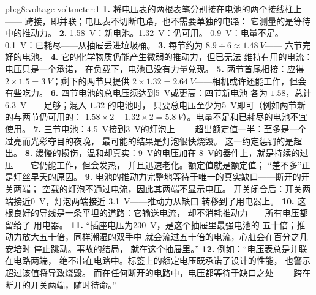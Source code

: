 \begin{solution}{pb:g8:voltage-voltmeter:1}
\textbf{1.} 将电压表的两根表笔分别接在电池的两个接线柱上——
跨接，即并联；电压表不切断电路，也不需要单独的电路：
它测量的是等待中的推动力。
\textbf{2.} \qty{1.58}{V}：新电池。\qty{1.32}{V}：仍可用。
\qty{0.9}{V}：电量不足。\qty{0.1}{V}：已耗尽——从抽屉丢进垃圾桶。
\textbf{3.} 每节约为 $8.9 \div 6 \approx \qty{1.48}{V}$——
六节完好的电池。
\textbf{4.} 它的化学物质仍能产生微弱的推动力，但已无法
维持有用的电流：电压只是一个承诺，
在负载下，电池已没有力量兑现。
\textbf{5.} 两节首尾相接：应得 $2 \times 1.5 =
\qty{3}{V}$；剩下的两节只提供 $2 \times 1.32 =
\qty{2.64}{V}$——相机或许还能工作，但会有些吃力。
\textbf{6.} 四节电池的总电压须达到\qty{5}{V}或更高：四节新电池
各为 $1.58$，总计\qty{6.3}{V}——足够；混入 $1.32$ 的电池时，
只要总电压至少为\qty{5}{V}即可（例如两节新的与两节仍可用的：
$1.58 \times 2 + 1.32 \times 2 =
\qty{5.8}{V}$）。电量不足和已耗尽的电池不宜使用。
\textbf{7.} 三节电池：\qty{4.5}{V}接到\qty{3}{V}的灯泡上——
超出额定值一半：至多是一个过亮而光彩夺目的夜晚，
最可能的结果是灯泡很快烧毁。
这一约定惩罚的是超出。
\textbf{8.} 缓慢的损伤，温和却真实：\qty{9}{V}的电压加在
\qty{8}{V}的器件上，就是持续的过压——它仍能工作，但会发热，
并且迅速老化。额定值就是额定值；
“差不多”正是灯丝早夭的原因。
\textbf{9.} 电池的推动力完整地等待于唯一的真实缺口——断开的开关两端；
空载的灯泡不通过电流，因此其两端不显示电压。
开关闭合后：开关两端接近\qty{0}{V}，灯泡两端接近
\qty{3.1}{V}——推动力从缺口
转移到了用电器上。
\textbf{10.} 这根良好的导线是一条平坦的道路：它输送电流，
却不消耗推动力——所有电压都留给了
用电器。
\textbf{11.} “插座电压为\qty{230}{V}，是这个抽屉里最强电池的
五十倍；推动力放大五十倍，同样潮湿的双手中
就会流过五十倍的电流，心脏会在百分之几安培时
停止跳动。事故的结局，
就在这个抽屉里。”
\textbf{12.} 例如：“电压表总是并联在电路两端，
绝不串在电路中。标签上的额定电压既承诺了设计的性能，
也警示超过该值将导致烧毁。
而在任何断开的电路中，电压都等待于缺口之处——
跨在断开的开关两端，随时待命。”
\end{solution}

